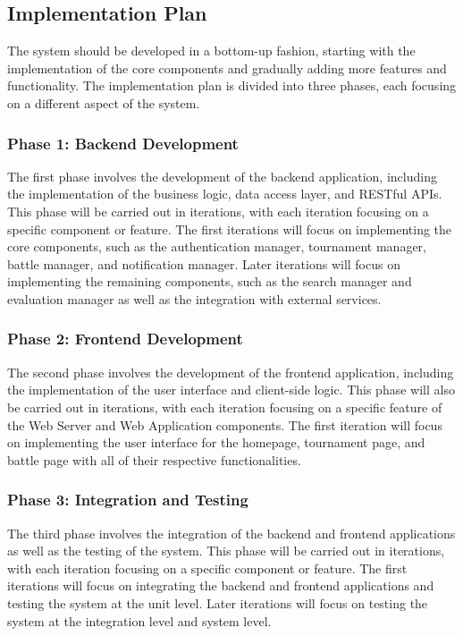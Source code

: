 \documentclass{article}
\begin{document}
\subsection{Implementation Plan}

The system should be developed in a bottom-up fashion, starting with the implementation of the core components and gradually adding more features and functionality. The implementation plan is divided into three phases, each focusing on a different aspect of the system.

\subsubsection*{Phase 1: Backend Development}

The first phase involves the development of the backend application, including the implementation of the business logic, data access layer, and RESTful APIs. This phase will be carried out in iterations, with each iteration focusing on a specific component or feature. The first iterations will focus on implementing the core components, such as the authentication manager, tournament manager, battle manager, and notification manager. Later iterations will focus on implementing the remaining components, such as the search manager and evaluation manager as well as the integration with external services.

\subsubsection*{Phase 2: Frontend Development}

The second phase involves the development of the frontend application, including the implementation of the user interface and client-side logic. This phase will also be carried out in iterations, with each iteration focusing on a specific feature of the Web Server and Web Application components. The first iteration will focus on implementing the user interface for the homepage, tournament page, and battle page with all of their respective functionalities.

\subsubsection*{Phase 3: Integration and Testing}

The third phase involves the integration of the backend and frontend applications as well as the testing of the system. This phase will be carried out in iterations, with each iteration focusing on a specific component or feature. The first iterations will focus on integrating the backend and frontend applications and testing the system at the unit level. Later iterations will focus on testing the system at the integration level and system level.
\end{document}
